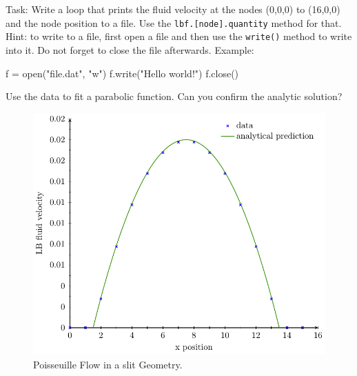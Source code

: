 Task: Write a loop that prints the fluid velocity at the nodes (0,0,0) to (16,0,0)
and the node position to a file. Use the \texttt{lbf.[node].quantity}
method for that. Hint: to write 
to a file, first open a file and then use the \texttt{write()} method to write 
into it. Do not forget to close the file afterwards. Example:
\vspace{ 0,2cm}
\begin{pypresso}
f = open("file.dat", "w")
f.write("Hello world!\n")
f.close()
\end{pypresso}
\vspace{ 0,2cm}
Use the data to fit a parabolic function. Can you confirm the analytic solution?
\begin{figure}[h]
  \begin{center}
    \includegraphics{figures/poiseuille/poiseuille.pdf}
  \end{center}
  \caption{Poisseuille Flow in a slit Geometry.}
\end{figure}


